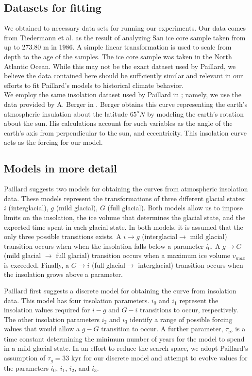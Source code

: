 \subsection{Datasets for fitting}
We obtained to necessary data sets for running our experiments.
Our \DO data comes from Tiedermann et al. \cite{d18} as the result of analyzing San ice core sample taken from up to 273.80 m in 1986. A simple linear transformation is used to scale from depth to the age of the samples. The ice core sample was taken in the North Atlantic Ocean. While this may not be the exact dataset used by Paillard, we believe the data contained here should be sufficiently similar and relevant in our efforts to fit Paillard's models to historical climate behavior.\\
\indent We employ the same insolation dataset used by Paillard in \cite{paillard1998timing}; namely, we use the data provided by A. Berger in \cite{berger1981long}.
Berger obtains this curve representing the earth's atmospheric insulation about the latitude $65^{o}N$ by modeling the earth's rotation about the sun.
His calculations account for such variables as the angle of the earth's axis from perpendicular to the sun, and eccentricity.
This insolation curve acts as the forcing for our model.

\subsection{Models in more detail}
Paillard \cite{paillard1998timing} suggests two models for obtaining the \DO curves from atmospheric insolation data. These models represent the transformations of three different glacial states: $i$ (interglacial), $g$ (mild glacial), $G$ (full glacial). Both models allow us to impose limits on the insolation, the ice volume that determines the glacial state, and the expected time spent in each glacial state. In both models, it is assumed that the only three possible transitions exists. A $i\rightarrow g$ (interglacial$\rightarrow$ mild glacial) transition occurs when when the insolation falls below a parameter $i_{0}$. A $g\rightarrow G$ (mild glacial $\rightarrow$ full glacial) transition occurs when a maximum ice volume $v_{max}$ is exceeded. Finally, a $G\rightarrow i$ (full glacial$\rightarrow$ interglacial) transition occurs when the insolation grows above a parameter.

Paillard first suggests a discrete model for obtaining the \DO curve from insolation data. This model has four insolation parameters.  $i_{0}$ and $i_{1}$ represent the insolation values required for $i-g$ and $G-i$ transitions to occur, respectively. The other insolation parameters $i_{2}$ and $i_{3}$ identify a range of possible forcing values that would allow a $g-G$ transition to occur. A further parameter, $\tau_{g}$, is a time constant determining the minimum number of years for the model to spend in a mild glacial state. In an effort to reduce the search space, we adopt Paillard's assumption of $\tau_{g}=33$ kyr for our discrete model and attempt to evolve values for the parameters $i_{0}$, $i_{1}$, $i_{2}$, and $i_{3}$.


